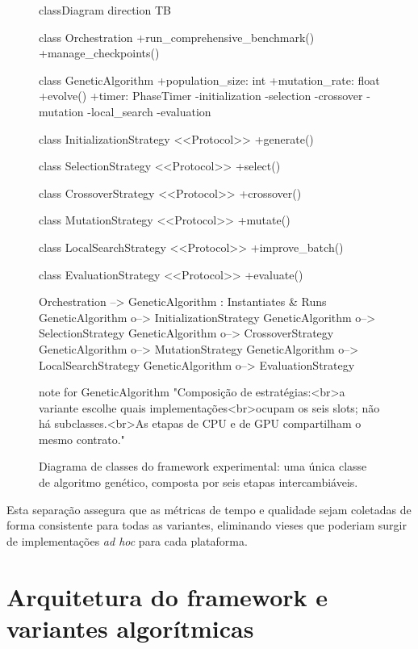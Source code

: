 \begin{figure}[htbp]
  \centering
  \begin{mermaid}
    classDiagram
    direction TB

    class Orchestration {
        +run_comprehensive_benchmark()
        +manage_checkpoints()
      }

    class GeneticAlgorithm {
        +population_size: int
        +mutation_rate: float
        +evolve()
        +timer: PhaseTimer
        -initialization
        -selection
        -crossover
        -mutation
        -local_search
        -evaluation
      }

    class InitializationStrategy {
        <<Protocol>>
        +generate()
      }

    class SelectionStrategy {
        <<Protocol>>
        +select()
      }

    class CrossoverStrategy {
        <<Protocol>>
        +crossover()
      }

    class MutationStrategy {
        <<Protocol>>
        +mutate()
      }

    class LocalSearchStrategy {
        <<Protocol>>
        +improve_batch()
      }

    class EvaluationStrategy {
        <<Protocol>>
        +evaluate()
      }

    Orchestration --> GeneticAlgorithm : Instantiates & Runs
    GeneticAlgorithm o--> InitializationStrategy
    GeneticAlgorithm o--> SelectionStrategy
    GeneticAlgorithm o--> CrossoverStrategy
    GeneticAlgorithm o--> MutationStrategy
    GeneticAlgorithm o--> LocalSearchStrategy
    GeneticAlgorithm o--> EvaluationStrategy

    note for GeneticAlgorithm "Composição de estratégias:<br>a variante escolhe quais implementações<br>ocupam os seis slots; não há subclasses.<br>As etapas de CPU e de GPU compartilham o mesmo contrato."
  \end{mermaid}
  \caption{Diagrama de classes do framework experimental: uma única classe de algoritmo genético, composta por seis etapas intercambiáveis.}
  \label{fig:class-diagram}
\end{figure}

Esta separação assegura que as métricas de tempo e qualidade sejam coletadas de forma consistente para todas as variantes, eliminando vieses que poderiam surgir de implementações \emph{ad hoc} para cada plataforma.

\section{Arquitetura do framework e variantes algorítmicas}\label{sec-32-arquitetura-variantes}

